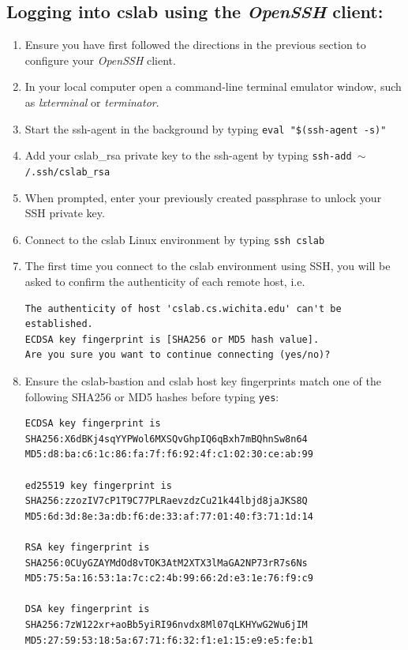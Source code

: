 \documentclass[12pt]{article}
\begin{document}
\begin{flushleft}
\newpage
\subsection*{Logging into cslab using the \textit{OpenSSH} client:}
\begin{enumerate}
  \item Ensure you have first followed the directions in the previous section to configure your \textit{OpenSSH} client.
  \item In your local computer open a command-line terminal emulator window, such as \textit{lxterminal} or \textit{terminator}.
  \item Start the ssh-agent in the background by typing \texttt{eval "\$(ssh-agent -s)"}
  \item Add your cslab\_rsa private key to the ssh-agent by typing \texttt{ssh-add $\sim$/.ssh/cslab\_rsa}
  \item When prompted, enter your previously created passphrase to unlock your SSH private key.
  \item Connect to the cslab Linux environment by typing \texttt{ssh cslab}
  \item The first time you connect to the cslab environment using SSH, you will be asked to confirm the authenticity of each remote host, i.e.
\begin{verbatim}
The authenticity of host 'cslab.cs.wichita.edu' can't be established.
ECDSA key fingerprint is [SHA256 or MD5 hash value].
Are you sure you want to continue connecting (yes/no)?
\end{verbatim}

  \item Ensure the cslab-bastion and cslab host key fingerprints match one of the following SHA256 or MD5 hashes before typing \texttt{yes}:
\begin{verbatim}
ECDSA key fingerprint is
SHA256:X6dBKj4sqYYPWol6MXSQvGhpIQ6qBxh7mBQhnSw8n64
MD5:d8:ba:c6:1c:86:fa:7f:f6:92:4f:c1:02:30:ce:ab:99

ed25519 key fingerprint is
SHA256:zzozIV7cP1T9C77PLRaevzdzCu21k44lbjd8jaJKS8Q
MD5:6d:3d:8e:3a:db:f6:de:33:af:77:01:40:f3:71:1d:14

RSA key fingerprint is
SHA256:0CUyGZAYMdOd8vTOK3AtM2XTX3lMaGA2NP73rR7s6Ns
MD5:75:5a:16:53:1a:7c:c2:4b:99:66:2d:e3:1e:76:f9:c9

DSA key fingerprint is
SHA256:7zW122xr+aoBb5yiRI96nvdx8Ml07qLKHYwG2Wu6jIM
MD5:27:59:53:18:5a:67:71:f6:32:f1:e1:15:e9:e5:fe:b1
\end{verbatim}


\end{enumerate}
\end{flushleft}
\end{document}
